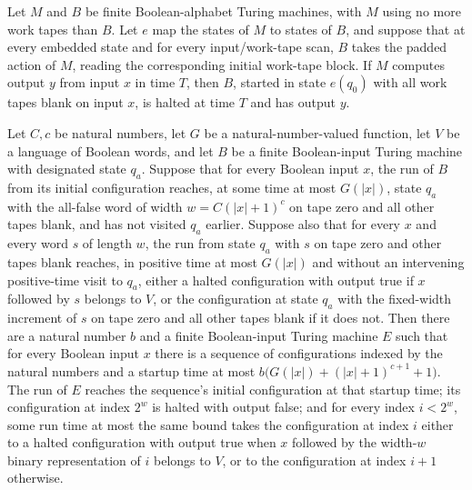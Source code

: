 \begin{lemma}
\label{Complexity.enumCont_lift_init}
\leanok
{}
Let $M$ and $B$ be finite Boolean-alphabet Turing machines, with $M$ using no more work
tapes than $B$. Let $e$ map the states of $M$ to states of $B$, and suppose that at
every embedded state and for every input/work-tape scan, $B$ takes the padded action of
$M$, reading the corresponding initial work-tape block. If $M$ computes output $y$ from
input $x$ in time $T$, then $B$, started in state $e(q_0)$ with all work tapes blank on
input $x$, is halted at time $T$ and has output $y$.
\end{lemma}

\begin{lemma}
\label{Complexity.enumCont_from_body}
\leanok
{}
Let $C,c$ be natural numbers, let $G$ be a natural-number-valued function, let $V$ be a
language of Boolean words, and let $B$ be a finite Boolean-input Turing machine with
designated state $q_a$. Suppose that for every Boolean input $x$, the run of $B$ from
its initial configuration reaches, at some time at most $G(|x|)$, state $q_a$ with the
all-false word of width $w=C(|x|+1)^c$ on tape zero and all other tapes blank, and has
not visited $q_a$ earlier. Suppose also that for every $x$ and every word $s$ of length
$w$, the run from state $q_a$ with $s$ on tape zero and other tapes blank reaches, in
positive time at most $G(|x|)$ and without an intervening positive-time visit to $q_a$,
either a halted configuration with output true if $x$ followed by $s$ belongs to $V$, or
the configuration at state $q_a$ with the fixed-width increment of $s$ on tape zero and
all other tapes blank if it does not. Then there are a natural number $b$ and a finite
Boolean-input Turing machine $E$ such that for every Boolean input $x$ there is a
sequence of configurations indexed by the natural numbers and a startup time at most
$b\bigl(G(|x|)+(|x|+1)^{c+1}+1\bigr)$. The run of $E$ reaches the sequence's initial
configuration at that startup time; its configuration at index $2^w$ is halted with
output false; and for every index $i<2^w$, some run time at most the same bound takes
the configuration at index $i$ either to a halted configuration with output true when
$x$ followed by the width-$w$ binary representation of $i$ belongs to $V$, or to the
configuration at index $i+1$ otherwise.
\end{lemma}

